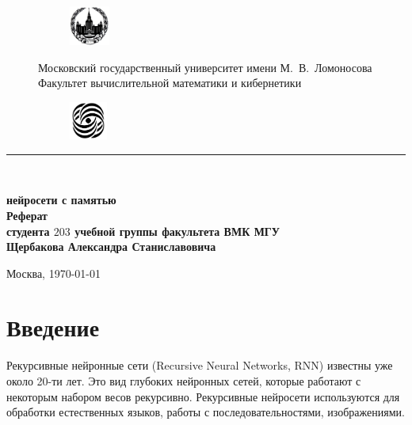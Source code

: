 \documentclass[14pt]{article}
\begin{document}
\begin{titlepage}

\newcommand{\HRule}{\rule{\linewidth}{0.5mm}} 
\centering 

\begin{figure}
    \centering
    \begin{subfigure}{1.5cm}
        \includegraphics[height=1.3cm]{msu.jpg}
    \end{subfigure}
    \parbox[t][0.2cm][c]{12cm}{
        \centering
        \large Московский государственный университет имени М.~В.~Ломоносова\\[0.5cm]
        \normalsize Факультет вычислительной математики и кибернетики
    }
    \begin{subfigure}{1.25cm}    
        \includegraphics[height=1.25cm]{cmc.jpg}
    \end{subfigure}
\end{figure}



\HRule \\[5cm]
{
 \bfseries \upshape
{ \Huge  {} нейросети с памятью\guillemotright }\\[0.2cm]
{\LARGE Реферат}\\[0.2cm]

{
\large
\vspace{1cm}
студента $203$ учебной группы факультета ВМК МГУ \\
Щербакова Александра Станиславовича
}

\vspace{9cm}
{\large Москва, \today}
} 


\vfill

\end{titlepage}

\tableofcontents
\pagebreak
\section{Введение}

\large
Рекурсивные нейронные сети (Recursive Neural Networks, RNN) известны уже около 20-ти лет. Это вид глубоких нейронных сетей, которые работают с некоторым набором весов рекурсивно. Рекурсивные нейросети используются для обработки естественных языков, работы с последовательностями, изображениями.
\end{document}
